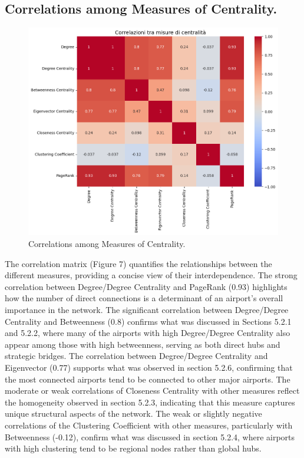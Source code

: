 \documentclass[12pt]{article}
\begin{document}
    \subsection{Correlations among Measures of Centrality.}
    \begin{figure}[H]
        \centering
        \includegraphics[width=0.8\linewidth]{img/correlations_measures_centrality.png}
        \caption{Correlations among Measures of Centrality.}
    \end{figure}
    The correlation matrix (Figure 7) quantifies the relationships between the different measures, providing a concise view of their interdependence.
    The strong correlation between Degree/Degree Centrality and PageRank (0.93) highlights how the number of direct connections is a determinant of an airport's overall importance in the network.
    The significant correlation between Degree/Degree Centrality and Betweenness (0.8) confirms what was discussed in Sections 5.2.1 and 5.2.2, where many of the airports with high Degree/Degree Centrality also appear among those with high betweenness, serving as both direct hubs and strategic bridges.
    The correlation between Degree/Degree Centrality and Eigenvector (0.77) supports what was observed in section 5.2.6, confirming that the most connected airports tend to be connected to other major airports.
    The moderate or weak correlations of Closeness Centrality with other measures reflect the homogeneity observed in section 5.2.3, indicating that this measure captures unique structural aspects of the network.
    The weak or slightly negative correlations of the Clustering Coefficient with other measures, particularly with Betweenness (-0.12), confirm what was discussed in section 5.2.4, where airports with high clustering tend to be regional nodes rather than global hubs.
\end{document}
